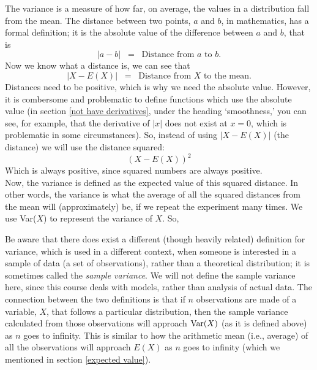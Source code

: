 \noindent The variance is a measure of how far, on average, the values in a distribution fall from the mean. The distance between two points, $a$ and $b$, in mathematics, has a formal definition; it is the absolute value of the difference between $a$ and $b$, that is
\[
|a - b| \;\; = \;\; \text{Distance from $a$ to $b$.}
\]
Now we know what a distance is, we can see that
\[
|X - E(X)| \;\; = \;\; \text{Distance from $X$ to the mean.}
\]
Distances need to be positive, which is why we need the absolute value. However, it is combersome and problematic to define functions which use the absolute value (in section \ref{not have derivatives}, under the heading `smoothness,' you can see, for example, that the derivative of $|x|$ does not exist at $x = 0$, which is problematic in some circumstances). So, instead of using $|X - E(X)|$ (the distance) we will use the distance squared:
\[
(X - E(X))^2
\]
Which is always positive, since squared numbers are always positive. \\

\noindent Now, the variance is defined as the expected value of this squared distance. In other words, the variance is what the average of all the squared distances from the mean will (approximately) be, if we repeat the experiment many times. We use Var($X$) to represent the variance of $X$. So,

  	\bigskip
	
	\hfil{}
	\bigskip
	\bigskip
	
\noindent Be aware that there does exist a different (though heavily related) definition for variance, which is used in a different context, when someone is interested in a sample of data (a set of observations), rather than a theoretical distribution; it is sometimes called the \textit{sample variance}. We will not define the sample variance here, since this course deals with models, rather than analysis of actual data. The connection between the two definitions is that if $n$ observations are made of a variable, $X$, that follows a particular distribution, then the sample variance calculated from those observations will approach $\text{Var}(X)$ (as it is defined above) as $n$ goes to infinity. This is similar to how the arithmetic mean (i.e., average) of all the observations will approach $E(X)$ as $n$ goes to infinity (which we mentioned in section \ref{expected value}).

